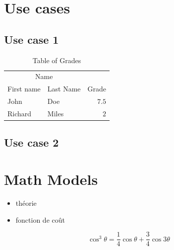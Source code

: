 \documentclass[fleqn,10pt]{SelfArx} %
\begin{document}

\section{Use cases}

\subsection{Use case 1}

\lipsum[11] %

\begin{table}[hbt]
\caption{Table of Grades}
\centering
\begin{tabular}{llr}
\toprule
\multicolumn{2}{c}{Name} \\
\cmidrule(r){1-2}
First name & Last Name & Grade \\
\midrule
John & Doe & $7.5$ \\
Richard & Miles & $2$ \\
\bottomrule
\end{tabular}
\label{tab:label}
\end{table}

\subsection{Use case 2}

\lipsum[15] %


\section{Math Models}

\begin{itemize}[noitemsep] %
\item th\'eorie
\item fonction de co\^ut
\end{itemize}

\begin{equation}
\cos^3 \theta =\frac{1}{4}\cos\theta+\frac{3}{4}\cos 3\theta
\label{eq:refname2}
\end{equation}
\end{document}
